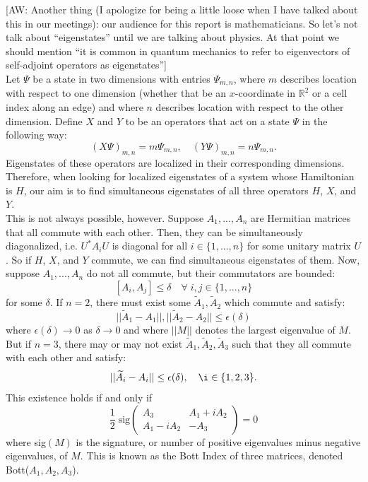 \documentclass[a4paper]{article}
\newcommand{\aw}[1]{{\color{blue} [AW: #1]}}
\begin{document}
\aw{Another thing (I apologize for being a little loose when I have talked about this in our meetings): our audience for this report is mathematicians. So let's not talk about ``eigenstates'' until we are talking about physics. At that point we should mention ``it is common in quantum mechanics to refer to eigenvectors of self-adjoint operators as eigenstates''} \\

Let $\Psi$ be a state in two dimensions with entries $\Psi_{m,n}$, where $m$ describes location with respect to one dimension (whether that be an $x$-coordinate in $\mathbb{R}^2$ or a cell index along an edge) and where $n$ describes location with respect to the other dimension.
Define $X$ and $Y$ to be an operators that act on a state $\Psi$ in the following way:
$$(X \Psi)_{m,n} = m\Psi_{m,n}, \quad (Y \Psi)_{m,n} = n\Psi_{m,n}.$$
Eigenstates of these operators are localized in their corresponding dimensions.
Therefore, when looking for localized eigenstates of a system whose Hamiltonian is $H$, our aim is to find simultaneous eigenstates of all three operators $H$, $X$, and $Y$.\\
This is not always possible, however.
Suppose $A_1,...,A_n$ are Hermitian matrices that all commute with each other.
Then, they can be simultaneously diagonalized, i.e. $U^* A_i U$ is diagonal for all $i \in \{1,...,n\}$ for some unitary matrix $U$.
So if $H$, $X$, and $Y$ commute, we can find simultaneous eigenstates of them.
Now, suppose $A_1,...,A_n$ do not all commute, but their commutators are bounded:
$$[A_i,A_j] \leq \delta \quad \forall\; i,j \in \{1,...,n\}$$
for some $\delta$.
If $n = 2$, there must exist some $\widetilde{A}_1, \widetilde{A}_2$ which commute and satisfy:
$$||\widetilde{A}_1 - A_1||, ||\widetilde{A}_2 - A_2|| \leq \epsilon(\delta)$$
where $\epsilon(\delta) \rightarrow 0$ as $\delta \rightarrow 0$ and where $||M||$ denotes the largest eigenvalue of $M$.\\
But if $n = 3$, there may or may not exist $\widetilde{A}_1, \widetilde{A}_2, \widetilde{A}_3$ such that they all commute with each other and satisfy:
$$||\widetilde{A}_i - A_i|| \leq \epsilon(\delta), \quad \i \in \{1,2,3\}.$$
This existence holds if and only if
$$\frac{1}{2}\; \text{sig} \begin{pmatrix}
A_3 & A_1 + iA_2\\
A_1 - iA_2 & - A_3
\end{pmatrix} = 0$$
where sig$(M)$ is the signature, or number of positive eigenvalues minus negative eigenvalues, of $M$. This is known as the Bott Index of three matrices, denoted Bott($A_1,A_2,A_3$).
\end{document}
